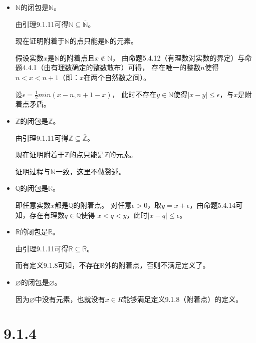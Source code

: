 \documentclass{article}
\begin{document}
\begin{itemize}
      \item $\mathbb{N}$的闭包是$\mathbb{N}$。

            由引理9.1.11可得$\mathbb{N} \subseteq \overline{\mathbb{N}}$。

            现在证明附着于$\mathbb{N}$的点只能是$\mathbb{N}$的元素。

            假设实数$x$是$\mathbb{N}$的附着点且$x \notin \mathbb{N}$，
            由命题5.4.12（有理数对实数的界定）与命题4.4.1（由有理数确定的整数散布）可得，
            存在唯一的整数$n$使得$n < x < n + 1$（即：$x$在两个自然数之间）。

            设$\epsilon = \frac{1}{2}min(x - n, n + 1 - x )$，
            此时不存在$y \in \mathbb{N}$使得$|x - y| \leq \epsilon$，与$x$是附着点矛盾。

      \item $\mathbb{Z}$的闭包是$\mathbb{Z}$。

            由引理9.1.11可得$\mathbb{Z} \subseteq \overline{\mathbb{Z}}$。

            现在证明附着于$\mathbb{Z}$的点只能是$\mathbb{Z}$的元素。

            证明过程与$\mathbb{N}$一致，这里不做赘述。

      \item $\mathbb{Q}$的闭包是$\mathbb{R}$。

            即任意实数$x$都是$\mathbb{Q}$的附着点。
            对任意$\epsilon > 0$，取$y = x + \epsilon$，由命题5.4.14可知，存在有理数$q \in \mathbb{Q}$使得
            $x < q < y$，此时$|x - q| \leq \epsilon$。

      \item $\mathbb{R}$的闭包是$\mathbb{R}$。

            由引理9.1.11可得$\mathbb{R} \subseteq \overline{\mathbb{R}}$。

            而有定义9.1.8可知，不存在$\mathbb{R}$外的附着点，否则不满足定义了。

      \item $\varnothing$的闭包是$\varnothing$。

            因为$\varnothing$中没有元素，也就没有$x \in R$能够满足定义9.1.8（附着点）的定义。
\end{itemize}

\section*{9.1.4}
\end{document}
